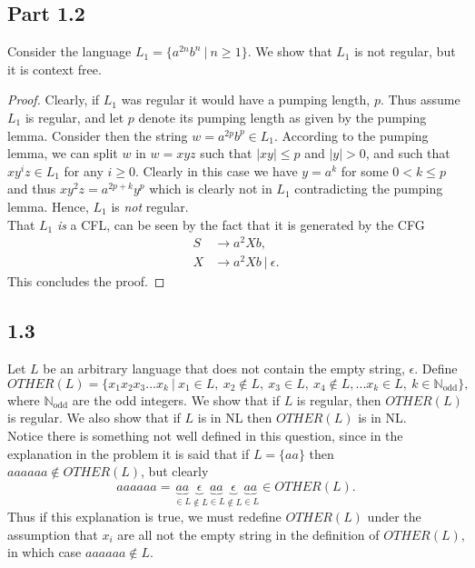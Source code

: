 \documentclass[a4paper,11pt]{article}
\newcommand{\abs}[1]{\left\lvert #1 \right\rvert}
\newcommand{\N}{\mathbb{N}}
\newcommand{\pipe}{\ \vert \ }
\numberwithin{equation}{section}
\begin{document}
	\subsection*{Part 1.2}
	Consider the language $ L_1=\{a^{2n}b^n\pipe n\geq1\} $. We show that $ L_1 $ is not regular, but it is context free.\begin{proof}
		Clearly, if $ L_1 $ was regular it would have a pumping length, $ p $. Thus assume $ L_1 $ is regular, and let $ p $ denote its pumping length as given by the pumping lemma. Consider then the string $ w=a^{2p}b^p\in L_1 $. According to the pumping lemma, we can split $ w $ in $ w=xyz $ such that $ \abs{xy}\leq p $ and $ \abs{y}>0 $, and such that $ xy^iz\in L_1 $ for any $ i\geq 0 $. Clearly in this case we have $ y=a^k $ for some $ 0<k\leq p $ and thus $ xy^2z=a^{2p+k}y^p $ which is clearly not in $ L_1 $ contradicting the pumping lemma. Hence, $ L_1 $ is \emph{not} regular.\\
		That $ L_1 $ \emph{is} a CFL, can be seen by the fact that it is generated by the CFG\begin{equation}
		 \begin{aligned}
		 S&\to a^2Xb,\\
		 X&\to a^2Xb\pipe \epsilon.
		 \end{aligned}
		\end{equation}
		This concludes the proof.
	\end{proof}
	\subsection*{1.3}
	Let $ L $ be an arbitrary language that does not contain the empty string, $ \epsilon $. Define \begin{equation}
	OTHER(L)=\{x_1x_2x_3...x_k\pipe x_1\in L,\ x_2\notin L,\ x_3\in L,\ x_4\notin L,...x_k\in L,\ k\in \mathbb{N}_{\text{odd}}  \},
	\end{equation}
	where $ \N_{\text{odd}} $ are the odd integers. We show that if $ L $ is regular, then $ OTHER(L) $ is regular. We also show that if $ L $ is in NL then $ OTHER(L) $ is in NL.\\
	Notice there is something not well defined in this question, since in the explanation in the problem it is said that if $ L=\{aa\} $ then $ aaaaaa\notin OTHER(L) $, but clearly $$ aaaaaa=\underbrace{aa}_{\in L}\underbrace{\epsilon}_{\notin L} \underbrace{aa}_{\in L}\underbrace{\epsilon}_{\notin L} \underbrace{aa}_{\in L}\in OTHER(L). $$
	Thus if this explanation is true, we must redefine $ OTHER(L) $ under the assumption that $ x_i $ are all not the empty string in the definition of $ OTHER(L) $, in which case $ aaaaaa\notin L $.
	
\end{document}
